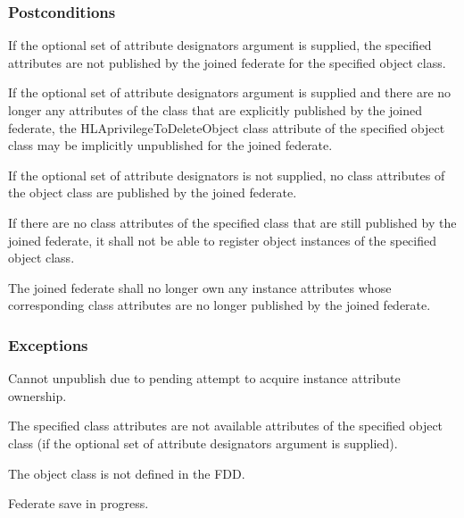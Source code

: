 \begin{compactstdpage}
    \subsubsection{Postconditions}
    \begin{stdalphalist}
        \item If the optional set of attribute designators argument is supplied, the specified attributes are not published by the joined federate for the specified object class.
        \item If the optional set of attribute designators argument is supplied and there are no longer any attributes of the class that are explicitly published by the joined federate, the HLAprivilegeToDeleteObject class attribute of the specified object class may be implicitly unpublished for the joined federate.
        \item If the optional set of attribute designators is not supplied, no class attributes of the object class are published by the joined federate.
        \item If there are no class attributes of the specified class that are still published by the joined federate, it shall not be able to register object instances of the specified object class.
        \item The joined federate shall no longer own any instance attributes whose corresponding class attributes are no longer published by the joined federate.
    \end{stdalphalist}

    \subsubsection{Exceptions}
    \begin{stdalphalist}
        \item Cannot unpublish due to pending attempt to acquire instance attribute ownership.
        \item The specified class attributes are not available attributes of the specified object class (if the optional set of attribute designators argument is supplied).
        \item The object class is not defined in the FDD.
        \item Federate save in progress.
    \end{stdalphalist}
\end{compactstdpage}

\clearpage

